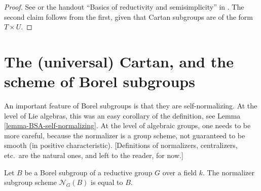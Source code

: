 \begin{proof}
See \cite[\S 13.17, Corollary 2]{Borel-LAG} or the handout ``Basics of reductivity and semisimplicity'' in \cite{Conrad-AG2}. The second claim follows from the first, given that Cartan subgroups are of the form $T\times U$.
\end{proof}


\section{The (universal) Cartan, and the scheme of Borel subgroups}
\label{section-universal-Cartan}



An important feature of Borel subgroups is that they are self-normalizing. At the level of Lie algebras, this was an easy corollary of the definition, see Lemma \ref{lemma-BSA-self-normalizing}. At the level of algebraic groups, one needs to be more careful, because the normalizer is a group scheme, not guaranteed to be smooth (in positive characteristic). [Definitions of normalizers, centralizers, etc.\ are the natural ones, and left to the reader, for now.]


\begin{theorem}
 \label{theorem-Borel-self-normalizing}
Let $B$ be a Borel subgroup of a reductive group $G$ over a field $k$. The normalizer subgroup scheme $\mathcal N_G(B)$ is equal to $B$. 
\end{theorem}

